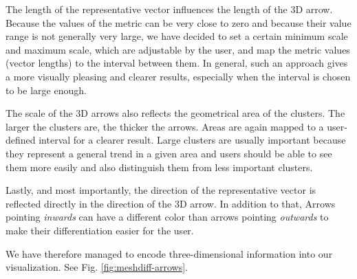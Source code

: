 The length of the representative vector influences the length of the 3D arrow. Because the values of the metric can be very close to zero and because their value range is not generally very large, we have decided to set a certain minimum scale and maximum scale, which are adjustable by the user, and map the metric values (vector lengths) to the interval between them. In general, such an approach gives a more visually pleasing and clearer results, especially when the interval is chosen to be large enough.

The scale of the 3D arrows also reflects the geometrical area of the clusters. The larger the clusters are, the thicker the arrows. Areas are again mapped to a user-defined interval for a clearer result. Large clusters are usually important because they represent a general trend in a given area and users should be able to see them more easily and also distinguish them from less important clusters.

Lastly, and most importantly, the direction of the representative vector is reflected directly in the direction of the 3D arrow. In addition to that, Arrows pointing {\it inwards} can have a different color than arrows pointing {\it outwards} to make their differentiation easier for the user.

We have therefore managed to encode three-dimensional information into our visualization. See Fig. \ref{fig:meshdiff-arrows}.

